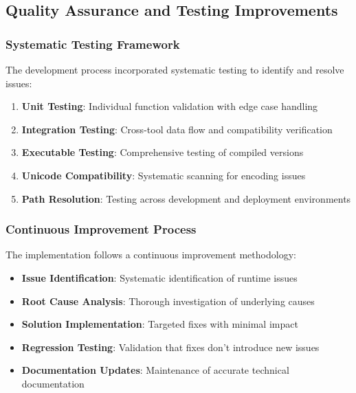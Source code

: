 \documentclass[binding=0.6cm]{sapthesis}
\begin{document}
\subsection{Quality Assurance and Testing Improvements}

\subsubsection{Systematic Testing Framework}

The development process incorporated systematic testing to identify and resolve issues:

\begin{enumerate}
    \item \textbf{Unit Testing}: Individual function validation with edge case handling
    \item \textbf{Integration Testing}: Cross-tool data flow and compatibility verification
    \item \textbf{Executable Testing}: Comprehensive testing of compiled versions
    \item \textbf{Unicode Compatibility}: Systematic scanning for encoding issues
    \item \textbf{Path Resolution}: Testing across development and deployment environments
\end{enumerate}

\subsubsection{Continuous Improvement Process}

The implementation follows a continuous improvement methodology:

\begin{itemize}
    \item \textbf{Issue Identification}: Systematic identification of runtime issues
    \item \textbf{Root Cause Analysis}: Thorough investigation of underlying causes
    \item \textbf{Solution Implementation}: Targeted fixes with minimal impact
    \item \textbf{Regression Testing}: Validation that fixes don't introduce new issues
    \item \textbf{Documentation Updates}: Maintenance of accurate technical documentation
\end{itemize}

\end{document}

